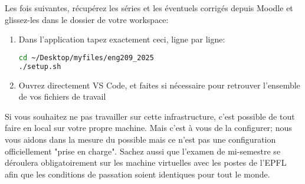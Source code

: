 \documentclass[10pt]{article}
\begin{document}
Les fois suivantes, récupérez les séries et les éventuels corrigés depuis Moodle et glissez-les dans le dossier de votre workspace:

\begin{enumerate}
\item Dans l'application  tapez exactement ceci, ligne par ligne:
\\
\begin{lstlisting}[language=Bash]
cd ~/Desktop/myfiles/eng209_2025
./setup.sh
\end{lstlisting}

\item Ouvrez directement VS Code, et faites  si nécessaire pour retrouver l'ensemble de vos fichiers de travail
\end{enumerate}

Si vous souhaitez ne pas travailler sur cette infrastructure, c'est possible de tout faire en local sur votre propre machine. Mais c'est à vous de la configurer; nous vous aidons dans la mesure du possible mais ce n'est pas une configuration officiellement "prise en charge". Sachez aussi que l'examen de mi-semestre se déroulera obligatoirement sur les machine virtuelles avec les postes de l'EPFL afin que les conditions de passation soient identiques pour tout le monde.
\end{document}
